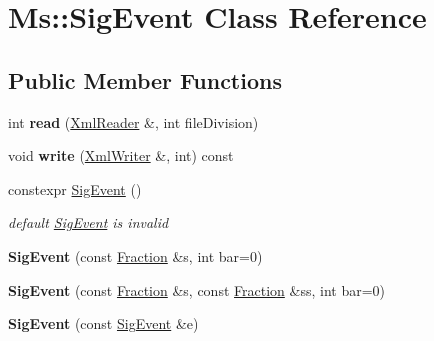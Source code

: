 \hypertarget{class_ms_1_1_sig_event}{}\section{Ms\+:\+:Sig\+Event Class Reference}
\label{class_ms_1_1_sig_event}
\subsection*{Public Member Functions}
\begin{DoxyCompactItemize}
\item 
\mbox{\label{class_ms_1_1_sig_event_aaacc0b884833ce4256ed440e7e0c10d1}} 
int {\bfseries read} (\hyperlink{class_ms_1_1_xml_reader}{Xml\+Reader} \&, int file\+Division)
\item 
\mbox{\label{class_ms_1_1_sig_event_ada3dd993d95ac7a219b16b243292f30e}} 
void {\bfseries write} (\hyperlink{class_ms_1_1_xml_writer}{Xml\+Writer} \&, int) const
\item 
\mbox{\label{class_ms_1_1_sig_event_a73457bf596807fa02b0d0e5ee41b27b6}} 
constexpr \hyperlink{class_ms_1_1_sig_event_a73457bf596807fa02b0d0e5ee41b27b6}{Sig\+Event} ()
\begin{DoxyCompactList}\small\item\em default \hyperlink{class_ms_1_1_sig_event}{Sig\+Event} is invalid \end{DoxyCompactList}\item 
\mbox{\label{class_ms_1_1_sig_event_a28344c9fc5fc314e7509723dc7b2f20a}} 
{\bfseries Sig\+Event} (const \hyperlink{class_ms_1_1_fraction}{Fraction} \&s, int bar=0)
\item 
\mbox{\label{class_ms_1_1_sig_event_ab334ed1adf57a9f0ae9ed074bc55b88a}} 
{\bfseries Sig\+Event} (const \hyperlink{class_ms_1_1_fraction}{Fraction} \&s, const \hyperlink{class_ms_1_1_fraction}{Fraction} \&ss, int bar=0)
\item 
\mbox{\label{class_ms_1_1_sig_event_a484db5195a65d8e09d0578bafc8bdf54}} 
{\bfseries Sig\+Event} (const \hyperlink{class_ms_1_1_sig_event}{Sig\+Event} \&e)
\item 

\end{DoxyCompactItemize}
